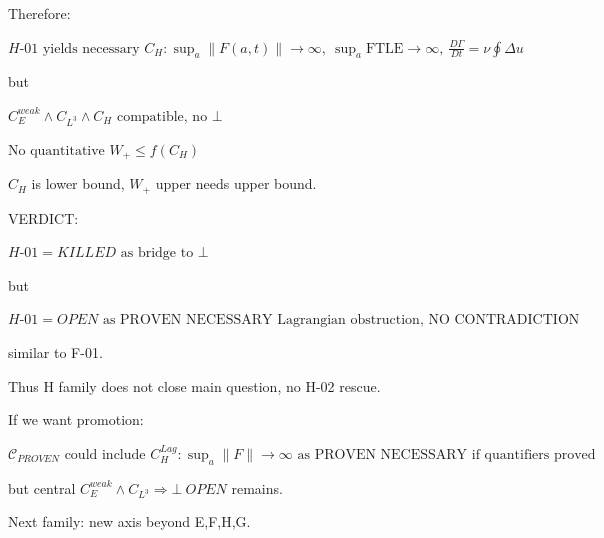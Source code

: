 \documentclass[11pt]{article}
\begin{document}
Therefore:

$\boxed{H\text{-}01\text{ yields necessary }C_H:\sup_a\|F(a,t)\|\to\infty,\ \sup_a\text{FTLE}\to\infty,\ \frac{D\Gamma}{Dt}=\nu\oint\Delta u}$

but

$\boxed{C_E^{weak}\land C_{L^3}\land C_H\text{ compatible, no }\bot}$

$\boxed{\text{No quantitative }W_+\le f(C_H)}$

$C_H$ is lower bound, $W_+$ upper needs upper bound.

VERDICT:

$\boxed{H\text{-}01=KILLED\text{ as bridge to }\bot}$

but

$\boxed{H\text{-}01=OPEN\text{ as PROVEN NECESSARY Lagrangian obstruction, NO CONTRADICTION}}$

similar to F-01.

Thus H family does not close main question, no H-02 rescue.

If we want promotion:

$\boxed{\mathcal C_{PROVEN}\text{ could include }C_H^{Lag}:\sup_a\|F\|\to\infty\text{ as PROVEN NECESSARY if quantifiers proved}}$

but central $\boxed{C_E^{weak}\land C_{L^3}\Rightarrow\bot\ OPEN}$ remains.

Next family: new axis beyond E,F,H,G.
\end{document}
